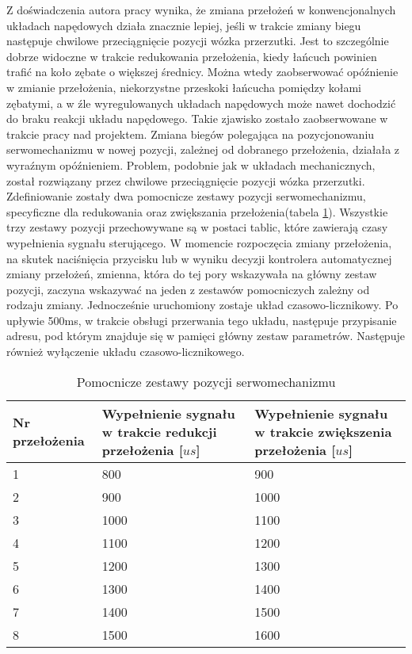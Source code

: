 Z doświadczenia autora pracy wynika, że zmiana przełożeń w konwencjonalnych układach napędowych działa znacznie lepiej, jeśli w trakcie zmiany biegu następuje chwilowe przeciągnięcie pozycji wózka przerzutki. Jest to szczególnie dobrze widoczne w trakcie redukowania przełożenia, kiedy łańcuch powinien trafić na koło zębate o większej średnicy. Można wtedy zaobserwować opóźnienie w zmianie przełożenia, niekorzystne przeskoki łańcucha pomiędzy kołami zębatymi, a w źle wyregulowanych układach napędowych może nawet dochodzić do braku reakcji układu napędowego. Takie zjawisko zostało zaobserwowane w trakcie pracy nad projektem. Zmiana biegów polegająca na pozycjonowaniu serwomechanizmu w nowej pozycji, zależnej od dobranego przełożenia, działała z wyraźnym opóźnieniem. Problem, podobnie jak w układach mechanicznych, został rozwiązany przez chwilowe przeciągnięcie pozycji wózka przerzutki. Zdefiniowanie zostały dwa pomocnicze zestawy pozycji serwomechanizmu, specyficzne dla redukowania oraz zwiększania przełożenia(tabela \ref{tab:przelozeniaPomocniczne}). Wszystkie trzy zestawy pozycji przechowywane są w postaci tablic, które zawierają czasy wypełnienia sygnału sterującego. W momencie rozpoczęcia zmiany przełożenia, na skutek naciśnięcia przycisku lub w wyniku decyzji kontrolera automatycznej zmiany przełożeń, zmienna, która do tej pory wskazywała na główny zestaw pozycji, zaczyna wskazywać na jeden z zestawów pomocniczych zależny od rodzaju zmiany. Jednocześnie uruchomiony zostaje układ czasowo-licznikowy. Po upływie 500ms, w trakcie obsługi przerwania tego układu, następuje przypisanie adresu, pod którym znajduje się w pamięci główny zestaw parametrów. Następuje również wyłączenie układu czasowo-licznikowego. 


\begin{table}[h]
    \caption{Pomocnicze zestawy pozycji serwomechanizmu}
    \begin{center}
		\label{tab:przelozeniaPomocniczne}
		\begin{tabular}{|p{2.3cm}|p{5cm}|p{5cm}|}
			\hline
 			\textbf{Nr przełożenia} & \textbf{Wypełnienie sygnału w trakcie redukcji przełożenia} [$us$] & 
\textbf{Wypełnienie sygnału w trakcie zwiększenia przełożenia [$us$]} \\
 			\hline
 			1 & 800 & 900 \\  
 			\hline
			2 & 900 & 1000 \\
			\hline
			3 & 1000 & 1100 \\  
			\hline
			4 & 1100 & 1200 \\  
			\hline
			5 & 1200 & 1300 \\  
			\hline
			6 & 1300 & 1400 \\  
			\hline
			7 & 1400 & 1500 \\  
			\hline
			8 & 1500 & 1600 \\  
			\hline
		\end{tabular}
	\end{center}
\end{table}

